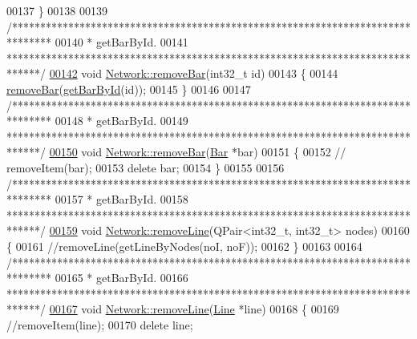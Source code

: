 \begin{DoxyCode}
00137 \}
00138 
00139 \textcolor{comment}{/*******************************************************************************}
00140 \textcolor{comment}{ * getBarById.}
00141 \textcolor{comment}{ ******************************************************************************/}
\hypertarget{network_8cpp_source_l00142}{}\hyperlink{group___graphics_ga997ce4f03d316b9f138f2e64e6ca400c}{00142} \textcolor{keywordtype}{void} \hyperlink{group___graphics_ga997ce4f03d316b9f138f2e64e6ca400c}{Network::removeBar}(int32\_t \textcolor{keywordtype}{id})
00143 \{
00144   \hyperlink{group___graphics_ga997ce4f03d316b9f138f2e64e6ca400c}{removeBar}(\hyperlink{group___graphics_ga9c5806f5a0d236bb6d8abbdce62d9675}{getBarById}(\textcolor{keywordtype}{id}));
00145 \}
00146 
00147 \textcolor{comment}{/*******************************************************************************}
00148 \textcolor{comment}{ * getBarById.}
00149 \textcolor{comment}{ ******************************************************************************/}
\hypertarget{network_8cpp_source_l00150}{}\hyperlink{group___graphics_ga7dea7690987c58fa61ffaa0326b68b68}{00150} \textcolor{keywordtype}{void} \hyperlink{group___graphics_ga997ce4f03d316b9f138f2e64e6ca400c}{Network::removeBar}(\hyperlink{class_bar}{Bar} *bar)
00151 \{
00152 \textcolor{comment}{//  removeItem(bar);}
00153   \textcolor{keyword}{delete} bar;
00154 \}
00155 
00156 \textcolor{comment}{/*******************************************************************************}
00157 \textcolor{comment}{ * getBarById.}
00158 \textcolor{comment}{ ******************************************************************************/}
\hypertarget{network_8cpp_source_l00159}{}\hyperlink{group___graphics_ga1eef3317224a7a06348fce07e581a9ad}{00159} \textcolor{keywordtype}{void} \hyperlink{group___graphics_ga1eef3317224a7a06348fce07e581a9ad}{Network::removeLine}(QPair<int32\_t, int32\_t> nodes)
00160 \{
00161   \textcolor{comment}{//removeLine(getLineByNodes(noI, noF));}
00162 \}
00163 
00164 \textcolor{comment}{/*******************************************************************************}
00165 \textcolor{comment}{ * getBarById.}
00166 \textcolor{comment}{ ******************************************************************************/}
\hypertarget{network_8cpp_source_l00167}{}\hyperlink{group___graphics_ga4fd51288aa75614593977ce8aab9100f}{00167} \textcolor{keywordtype}{void} \hyperlink{group___graphics_ga1eef3317224a7a06348fce07e581a9ad}{Network::removeLine}(\hyperlink{class_line}{Line} *line)
00168 \{
00169   \textcolor{comment}{//removeItem(line);}
00170   \textcolor{keyword}{delete} line;

\end{DoxyCode}

